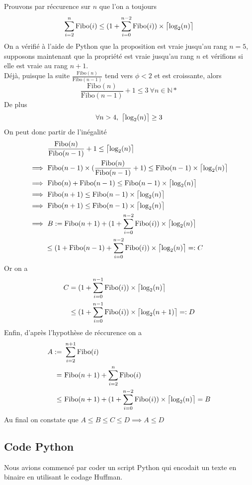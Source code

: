 \documentclass[a4paper, 12pt]{article}
\DeclarePairedDelimiter{\ceil}{\lceil}{\rceil}
\let\qed\square
\begin{document}
Prouvons par réccurence sur $n$ que l'on a toujours
$$
\sum_{i = 2}^n \text{Fibo}(i) \leq (1+\sum_{i = 0}^{n-2}\text{Fibo}(i))\times \ceil[\big]{\text{log}_2(n)}
$$
On a vérifié à l'aide de Python que la proposition est vraie jusqu'au rang $n = 5$, supposons maintenant que la propriété est vraie jusqu'au rang $n$ et vérifions si elle est vraie au rang $n+1$. \\
Déjà, puisque la suite $\frac{\text{Fibo}(n)}{\text{Fibo}(n-1)}$ tend vers $\phi < 2$ et est croissante, alors
$$
\frac{\text{Fibo}(n)}{\text{Fibo}(n-1)}+1 \leq 3\ \forall n \in \mathbb{N*}
$$
De plus
$$
\forall n > 4,\ \ceil[\big]{\text{log}_2(n)} \geq 3
$$
On peut donc partir de l'inégalité
\begin{align*}
&\ \frac{\text{Fibo}(n)}{\text{Fibo}(n-1)}+1 \leq \ceil[\big]{\text{log}_2(n)} \\
\implies&\ \text{Fibo}(n-1)\times(\frac{\text{Fibo}(n)}{\text{Fibo}(n-1)}+1) \leq \text{Fibo}(n-1)\times\ceil[\big]{\text{log}_2(n)} \\
\implies&\ \text{Fibo}(n)+\text{Fibo}(n-1) \leq \text{Fibo}(n-1)\times\ceil[\big]{\text{log}_2(n)} \\
\implies&\ \text{Fibo}(n+1) \leq \text{Fibo}(n-1)\times\ceil[\big]{\text{log}_2(n)} \\
\implies&\ \text{Fibo}(n+1) \leq \text{Fibo}(n-1)\times\ceil[\big]{\text{log}_2(n)} \\
\implies&\ B := \text{Fibo}(n+1)+(1+\sum_{i = 0}^{n-2}\text{Fibo}(i))\times \ceil[\big]{\text{log}_2(n)} \\
&\leq (1+\text{Fibo}(n-1)+\sum_{i = 0}^{n-2}\text{Fibo}(i))\times \ceil[\big]{\text{log}_2(n)} =: C
\end{align*}
Or on a
\begin{align*}
C &= (1+\sum_{i = 0}^{n-1}\text{Fibo}(i))\times \ceil[\big]{\text{log}_2(n)} \\
&\leq (1+\sum_{i = 0}^{n-1}\text{Fibo}(i))\times \ceil[\big]{\text{log}_2(n+1)} =: D
\end{align*}
Enfin, d'après l'hypothèse de réccurence on a
\begin{align*}
A :=&\ \sum_{i = 2}^{n+1} \text{Fibo}(i) \\
=&\ \text{Fibo}(n+1)+\sum_{i = 2}^n \text{Fibo}(i) \\
\leq&\ \text{Fibo}(n+1)+(1+\sum_{i = 0}^{n-2}\text{Fibo}(i))\times \ceil[\big]{\text{log}_2(n)} = B
\end{align*}
Au final on constate que $A \leq B \leq C \leq D \implies A \leq D$ \\
\qed

\subsection{Code Python}
Nous avions commencé par coder un script Python qui encodait un texte en binaire en utilisant le codage Huffman. \\

\end{document}
